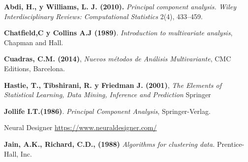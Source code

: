 
\begin{thebibliography}{99}
	

 \textbf{Abdi, H., y Williams, L. J. (2010).} \textit{Principal component analysis. Wiley Interdisciplinary Reviews: Computational Statistics}  2(4), 433–459. 

 \textbf{Chatfield,C y Collins A.J (1989)}. {\em Introduction to multivariate analysis}, Chapman and Hall.

 \textbf{Cuadras, C.M. (2014)}, \textit{Nuevos métodos de Análisis Multivariante}, CMC Editions, Barcelona. 

 \textbf{Hastie, T., Tibshirani, R. y Friedman J. (2001)}, \textit{The Elements of Statistical Learning, Data Mining, Inference and Prediction} Springer 

 \textbf{Jollife I.T.(1986)}. {\em Principal Component Analysis}, Springer-Verlag.

 Neural Designer \url{https://www.neuraldesigner.com/}

 \textbf{Jain, A.K., Richard, C.D., (1988)} \textit{Algorithms for clustering data.} Prentice-Hall, Inc. 


          
        
\end{thebibliography}
 